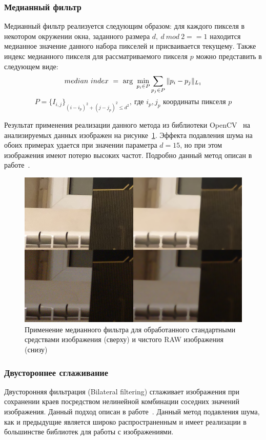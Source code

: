 \subsubsection{Медианный фильтр}

Медианный фильтр реализуется следующим образом: для каждого пикселя в некотором окружении окна, заданного размера $d,\ d\ mod\ 2 == 1$ находится медианное значение данного набора пикселей и присваивается текущему. Также индекс медианного пикселя для рассматриваемого пикселя $p$ можно представить в следующем виде:
\begin{equation}
median\ index\ =\ \arg\ \min_{p_i \in P} \sum_{p_j \in P} \Arrowvert p_i - p_j \Arrowvert_{L_1}
\end{equation}
$$P = \{I_{i, j}\}_ {(i - i_p)^2 + (j - j_p)^2 \le d^2},\ \text{где }i_p, j_p\text{ координаты пикселя }p$$

Результат применения реализации данного метода из библиотеки OpenCV~\autocite{OpenCVLib} на анализируемых данных изображен на рисунке~\ref{fig:medianblur_comparison}. Эффекта подавления шума на обоих примерах удается при значении параметра $d = 15$, но при этом изображения имеют потерю высоких частот. Подробно данный метод описан в работе~\autocite{MedicalImagesProcessing}. 

\begin{figure}[h]
	\centering
	\includegraphics[width=\textwidth]{img/medianfilter_comparison}
	\caption{Применение медианного фильтра для обработанного стандартными средствами изображения (сверху) и чистого RAW изображения (снизу)}
	\label{fig:medianblur_comparison}
\end{figure}

\subsubsection{Двустороннее сглаживание}
Двусторонняя фильтрация (Bilateral filtering) сглаживает изображения при сохранении краев посредством нелинейной комбинации соседних значений изображения. Данный подход описан в работе~\autocite{BilateralPaper}. Данный метод подавления шума, как и предыдущие является широко распространенным и имеет реализации в большинстве библиотек для работы с изображениями. 

